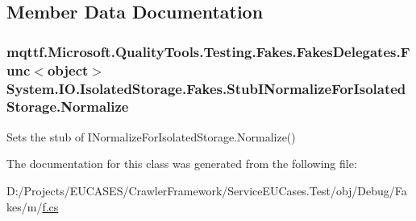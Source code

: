 \subsection{Member Data Documentation}
\hypertarget{class_system_1_1_i_o_1_1_isolated_storage_1_1_fakes_1_1_stub_i_normalize_for_isolated_storage_a8d094db0bbdc17ffec5d5898df398432}{
\subsubsection[{Normalize}]{\setlength{\rightskip}{0pt plus 5cm}mqttf.\-Microsoft.\-Quality\-Tools.\-Testing.\-Fakes.\-Fakes\-Delegates.\-Func$<$object$>$ System.\-I\-O.\-Isolated\-Storage.\-Fakes.\-Stub\-I\-Normalize\-For\-Isolated\-Storage.\-Normalize}}\label{class_system_1_1_i_o_1_1_isolated_storage_1_1_fakes_1_1_stub_i_normalize_for_isolated_storage_a8d094db0bbdc17ffec5d5898df398432}


Sets the stub of I\-Normalize\-For\-Isolated\-Storage.\-Normalize()



The documentation for this class was generated from the following file\-:\begin{DoxyCompactItemize}
\item 
D\-:/\-Projects/\-E\-U\-C\-A\-S\-E\-S/\-Crawler\-Framework/\-Service\-E\-U\-Cases.\-Test/obj/\-Debug/\-Fakes/m/\hyperlink{m_2f_8cs}{f.\-cs}\end{DoxyCompactItemize}
